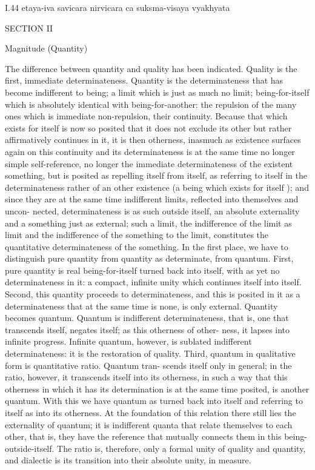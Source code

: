 I.44
etaya-iva savicara nirvicara ca suksma-visaya vyakhyata

SECTION II

Magnitude (Quantity)

The difference between quantity and quality has been indicated.
Quality is the first, immediate determinateness.
Quantity is the determinateness that has become indifferent to being;
a limit which is just as much no limit;
being-for-itself which is absolutely identical with being-for-another:
the repulsion of the many ones which is immediate non-repulsion,
their continuity.
Because that which exists for itself is now so posited
that it does not exclude its other but rather affirmatively
continues in it, it is then otherness,
inasmuch as existence surfaces again on this continuity and
its determinateness is at the same time no longer simple self-reference, no longer
the immediate determinateness of the existent something, but is posited
as repelling itself from itself, as referring to itself in the determinateness
rather of an other existence (a being which exists for itself ); and since they
are at the same time indifferent limits, reflected into themselves and uncon-
nected, determinateness is as such outside itself, an absolute externality and
a something just as external; such a limit, the indifference of the limit as
limit and the indifference of the something to the limit, constitutes the
quantitative determinateness of the something.
In the first place, we have to distinguish pure quantity from quantity
as determinate, from quantum. First, pure quantity is real being-for-itself
turned back into itself, with as yet no determinateness in it: a compact,
infinite unity which continues itself into itself.
Second, this quantity proceeds to determinateness, and
this is posited in it as a determinateness that
at the same time is none, is only external.
Quantity becomes quantum. Quantum is indifferent determinateness,
that is, one that transcends itself, negates itself; as this otherness of other-
ness, it lapses into infinite progress.
Infinite quantum, however, is sublated indifferent determinateness:
it is the restoration of quality.
Third, quantum in qualitative form is quantitative ratio. Quantum tran-
scends itself only in general; in the ratio, however, it transcends itself
into its otherness, in such a way that this otherness in which it has its
determination is at the same time posited, is another quantum. With this
we have quantum as turned back into itself and referring to itself as into
its otherness.
At the foundation of this relation there still lies the externality of quantum;
it is indifferent quanta that relate themselves to each other, that is,
they have the reference that mutually connects them in this being-outside-itself.
The ratio is, therefore, only a formal unity of quality and quantity, and
dialectic is its transition into their absolute unity, in measure.

